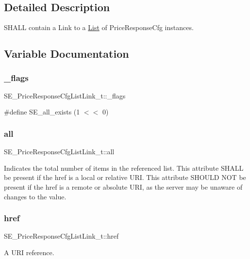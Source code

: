 \subsection{Detailed Description}
S\+H\+A\+LL contain a Link to a \hyperlink{structList}{List} of Price\+Response\+Cfg instances. 

\subsection{Variable Documentation}
\mbox{\label{group__PriceResponseCfgListLink_gabc4cbe7ac6f6ff978fe6bf45dfd3efcd}} 
\subsubsection{\texorpdfstring{\+\_\+flags}{\_flags}}
{\footnotesize\ttfamily S\+E\+\_\+\+Price\+Response\+Cfg\+List\+Link\+\_\+t\+::\+\_\+flags}

\#define S\+E\+\_\+all\+\_\+exists (1 $<$$<$ 0) \mbox{\label{group__PriceResponseCfgListLink_gadf74318e90daf92ff98a6f3a3d2e2c2b}} 
\subsubsection{\texorpdfstring{all}{all}}
{\footnotesize\ttfamily S\+E\+\_\+\+Price\+Response\+Cfg\+List\+Link\+\_\+t\+::all}

Indicates the total number of items in the referenced list. This attribute S\+H\+A\+LL be present if the href is a local or relative U\+RI. This attribute S\+H\+O\+U\+LD N\+OT be present if the href is a remote or absolute U\+RI, as the server may be unaware of changes to the value. \mbox{\label{group__PriceResponseCfgListLink_ga251e7e1e13f7186865ef9cee46ae1ca8}} 
\subsubsection{\texorpdfstring{href}{href}}
{\footnotesize\ttfamily S\+E\+\_\+\+Price\+Response\+Cfg\+List\+Link\+\_\+t\+::href}

A U\+RI reference. 